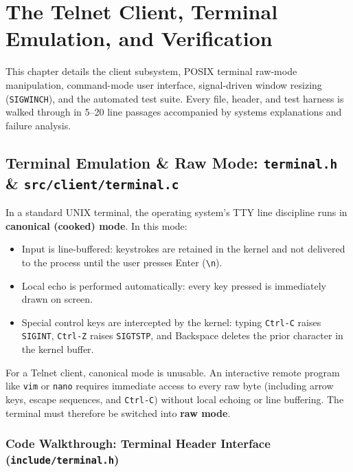\chapter{The Telnet Client, Terminal Emulation, and Verification}
\label{chap:client}

This chapter details the client subsystem, POSIX terminal raw-mode manipulation, command-mode user interface, signal-driven window resizing (\texttt{SIGWINCH}), and the automated test suite. Every file, header, and test harness is walked through in 5--20 line passages accompanied by systems explanations and failure analysis.

\section{Terminal Emulation \& Raw Mode: \texttt{terminal.h} \& \texttt{src/client/terminal.c}}

In a standard UNIX terminal, the operating system's TTY line discipline runs in \textbf{canonical (cooked) mode}. In this mode:
\begin{itemize}[leftmargin=1.5em]
    \item Input is line-buffered: keystrokes are retained in the kernel and not delivered to the process until the user presses Enter (\texttt{\textbackslash n}).
    \item Local echo is performed automatically: every key pressed is immediately drawn on screen.
    \item Special control keys are intercepted by the kernel: typing \texttt{Ctrl-C} raises \texttt{SIGINT}, \texttt{Ctrl-Z} raises \texttt{SIGTSTP}, and Backspace deletes the prior character in the kernel buffer.
\end{itemize}
For a Telnet client, canonical mode is unusable. An interactive remote program like \texttt{vim} or \texttt{nano} requires immediate access to every raw byte (including arrow keys, escape sequences, and \texttt{Ctrl-C}) without local echoing or line buffering. The terminal must therefore be switched into \textbf{raw mode}.

\subsection{Code Walkthrough: Terminal Header Interface (\texttt{include/terminal.h})}

